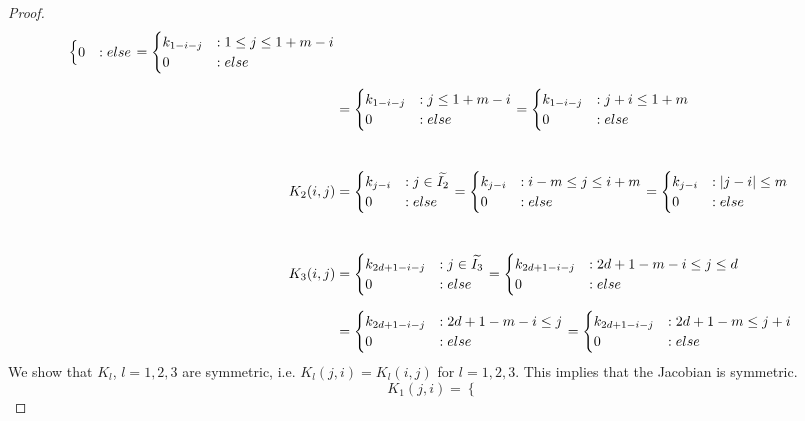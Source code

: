 \documentclass[twoside,a4paper]{article}
\begin{document}
\begin{proof}
\begin{align*}
\begin{cases}
			0 & : else
		\end{cases} = \begin{cases}
			k_{1-i-j} & : 1 \leq j \leq 1+m-i \\
			0 & : else
		\end{cases} \\[7pt]
		&= \begin{cases}
			k_{1-i-j} & : j \leq 1+m-i \\
			0 & : else
		\end{cases} = \begin{cases}
			k_{1-i-j} & : j+i \leq 1+m \\
			0 & : else
		\end{cases} \\[25pt]
		K_2(i,j) &= \begin{cases}
			k_{j-i} & : j \in \widetilde{I_2} \\
			0 & : else
		\end{cases} = \begin{cases}
			k_{j-i} & : i-m \leq j \leq i+m \\
			0 & : else
		\end{cases} = \begin{cases}
			k_{j-i} & : \left|{j-i}\right| \leq m \\
			0 & : else
		\end{cases} \\[25pt]
		K_3(i,j) &= \begin{cases}
			k_{2d+1-i-j} & : j \in \widetilde{I_3} \\
			0 & : else
		\end{cases} = \begin{cases}
			k_{2d+1-i-j} & : 2d+1-m-i \leq j \leq d \\
			0 & : else
		\end{cases} \\[7pt]
		&= \begin{cases}
			k_{2d+1-i-j} & : 2d+1-m-i \leq j \\
			0 & : else
		\end{cases}
		= \begin{cases}
			k_{2d+1-i-j} & : 2d+1-m \leq j+i \\
			0 & : else
		\end{cases}
	\end{align*}
	We show that $K_l$, $l=1,2,3$ are symmetric, i.e. $K_l(j,i) = K_l(i,j)$ for
	$l=1,2,3$. This implies that the Jacobian is symmetric.
	\begin{equation*}
		K_1(j,i) = \begin{cases}

\end{cases}
\end{equation*}
\end{proof}
\end{document}
